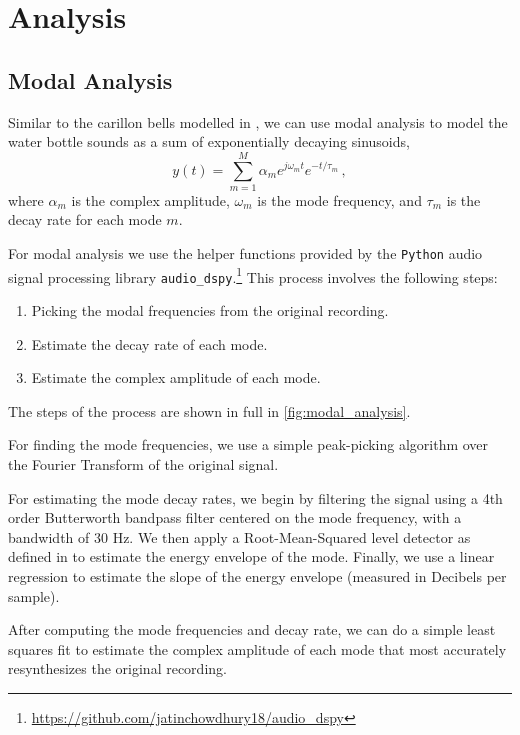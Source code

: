 \documentclass[twoside,a4paper]{article}
\begin{document}
\section{Analysis} \label{sec:analysis}


\subsection{Modal Analysis} \label{sec:modal-analysis}
%
Similar to the carillon bells modelled in \cite{canfielddafilou:werner:bellEffects:2017,rau:das:canfielddafilou:carillon:2019},
we can use modal analysis to model the water bottle sounds as
a sum of exponentially decaying sinusoids,
\begin{equation}
    y(t) = \sum_{m=1}^M \alpha_m e^{j\omega_m t} e^{-t/\tau_m} \,,
    \label{eq:modal-def}
\end{equation}
%
where $\alpha_m$ is the complex amplitude, $\omega_m$ is the mode
frequency, and $\tau_m$ is the decay rate for each mode $m$.

For modal analysis we use the helper functions
provided by the \texttt{Python} audio signal processing library
\texttt{audio\_dspy}.\footnote{\url{https://github.com/jatinchowdhury18/audio_dspy}}
This process involves the following steps:
\begin{enumerate}
    \item Picking the modal frequencies from the original recording.
    \item Estimate the decay rate of each mode.
    \item Estimate the complex amplitude of each mode.
\end{enumerate}
%
The steps of the process are shown in  full in \cref{fig:modal_analysis}.

For finding the mode frequencies, we use a simple peak-picking
algorithm over the Fourier Transform of the original signal.

For estimating the mode decay rates, we begin by filtering
the signal using a 4th order Butterworth bandpass filter
centered on the mode frequency, with a bandwidth of 30 Hz.
We then apply a Root-Mean-Squared level detector as defined
in \cite{giannoulis2012compressor} to estimate the energy
envelope of the mode. Finally, we use a linear regression
to estimate the slope of the energy envelope (measured in
Decibels per sample).

After computing the mode frequencies and decay
rate, we can do a simple least squares fit to
estimate the complex amplitude of each mode that
most accurately resynthesizes the original recording.
\end{document}
